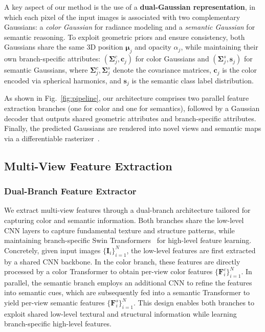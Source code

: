 \documentclass[letterpaper, 10 pt, conference]{ieeeconf}  %
\begin{document}
A key aspect of our method is the use of a \textbf{dual-Gaussian representation}, in which each pixel of the input images is associated with two complementary Gaussians: a \textit{color Gaussian} for radiance modeling and a \textit{semantic Gaussian} for semantic reasoning.
To exploit geometric priors and ensure consistency, both Gaussians share the same 3D position $\bm{\mu}_j$ and opacity $\alpha_j$, while maintaining their own branch-specific attributes: $(\mathbf{\Sigma}^c_j,\mathbf{c}_j)$ for color Gaussians and $(\mathbf{\Sigma}^s_j,\mathbf{s}_j)$ for semantic Gaussians, where $\mathbf{\Sigma}^c_j,\mathbf{\Sigma}^s_j$ denote the covariance matrices, $\mathbf{c}_j$ is the color encoded via spherical harmonics, and $\mathbf{s}_j$ is the semantic class label distribution.

As shown in Fig.~\ref{fig:pipeline}, our architecture comprises two parallel feature extraction branches (one for color and one for semantics), followed by a Gaussian decoder that outputs shared geometric attributes and branch-specific attributes.
Finally, the predicted Gaussians are rendered into novel views and semantic maps via a differentiable rasterizer~\cite{3dgs}.

\subsection{Multi-View Feature Extraction}
\label{sec:dual-branch-feature}
\subsubsection{Dual-Branch Feature Extractor}
We extract multi-view features through a dual-branch architecture tailored for capturing color and semantic information.
Both branches share the low-level CNN layers to capture fundamental texture and structure patterns, while maintaining branch-specific Swin Transformers~\cite{swin} for high-level feature learning.
Concretely, given input images $\{\mathbf{I}_i\}_{i=1}^N$, the low-level features are first extracted by a shared CNN backbone.
In the color branch, these features are directly processed by a color Transformer to obtain per-view color features $\{\mathbf{F}^c_i\}_{i=1}^N$.
In parallel, the semantic branch employs an additional CNN to refine the features into semantic cues, which are subsequently fed into a semantic Transformer to yield per-view semantic features $\{\mathbf{F}^s_i\}_{i=1}^N$.
This design enables both branches to exploit shared low-level textural and structural information while learning branch-specific high-level features.
\end{document}
